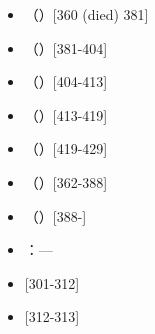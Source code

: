 \begin{itemize}
\item {}（）[360 (died) 381]
\end{itemize}

\begin{itemize}
\item {}（）[381-404]
\end{itemize}

\begin{itemize}
\item {}（）[404-413]
\end{itemize}

\begin{itemize}
\item {}（）[413-419]
\end{itemize}

\begin{itemize}
\item {}（）[419-429]
\end{itemize}

\begin{itemize}
\item {}（）[362-388]
\end{itemize}

\begin{itemize}
\item {}（）[388-]
\end{itemize}

\begin{itemize}
\item {}：—
\end{itemize}

\begin{itemize}
\item {} [301-312]
\end{itemize}

\begin{itemize}
\item {} [312-313]
\end{itemize}

